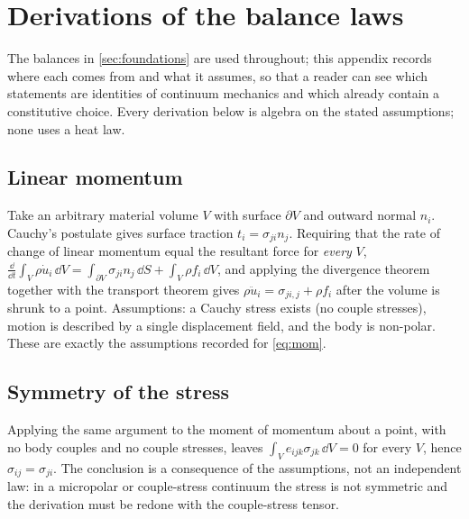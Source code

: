 
\section{Derivations of the balance laws}\label{app:balance}

The balances in \cref{sec:foundations} are used throughout; this appendix records where each comes from
and what it assumes, so that a reader can see which statements are identities of continuum mechanics and
which already contain a constitutive choice. Every derivation below is algebra on the stated assumptions;
none uses a heat law.

\subsection*{Linear momentum}\label{eq:bal-mom}
Take an arbitrary material volume $V$ with surface $\partial V$ and outward normal $n_i$. Cauchy's
postulate gives surface traction $t_i=\sigma_{ji}n_j$. Requiring that the rate of change of linear momentum
equal the resultant force for \emph{every} $V$,
$\frac{\dd}{\dd t}\int_V\rho\dot u_i\,\dd V=\int_{\partial V}\sigma_{ji}n_j\,\dd S+\int_V\rho f_i\,\dd V$,
and applying the divergence theorem together with the transport theorem gives
$\rho\ddot u_i=\sigma_{ji,j}+\rho f_i$ after the volume is shrunk to a point. Assumptions: a Cauchy
stress exists (no couple stresses), motion is described by a single displacement field, and the body is
non-polar. These are exactly the assumptions recorded for \eqref{eq:mom}.

\subsection*{Symmetry of the stress}\label{eq:bal-sym}
Applying the same argument to the moment of momentum about a point, with no body couples and no couple
stresses, leaves $\int_V e_{ijk}\sigma_{jk}\,\dd V=0$ for every $V$, hence $\sigma_{ij}=\sigma_{ji}$. The
conclusion is a consequence of the assumptions, not an independent law: in a micropolar or couple-stress
continuum the stress is not symmetric and the derivation must be redone with the couple-stress tensor.

